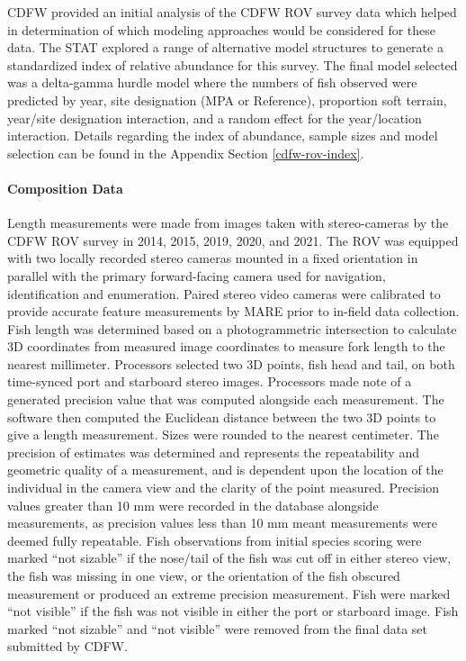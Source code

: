 \documentclass[11pt,
  english,
  letterpaper,
]{article}
\begin{document}
CDFW provided an initial analysis of the CDFW ROV survey data which helped in determination of which modeling approaches would be considered for these data. The STAT explored a range of alternative model structures to generate a standardized index of relative abundance for this survey. The final model selected was a delta-gamma hurdle model where the numbers of fish observed were predicted by year, site designation (MPA or Reference), proportion soft terrain, year/site designation interaction, and a random effect for the year/location interaction. Details regarding the index of abundance, sample sizes and model selection can be found in the Appendix Section \ref{cdfw-rov-index}.

\hypertarget{composition-data-4}{%
\paragraph{Composition Data}\label{composition-data-4}}

\hfill\break

Length measurements were made from images taken with stereo-cameras by the CDFW ROV survey in 2014, 2015, 2019, 2020, and 2021. The ROV was equipped with two locally recorded stereo cameras mounted in a fixed orientation in parallel with the primary forward-facing camera used for navigation, identification and enumeration. Paired stereo video cameras were calibrated to provide accurate feature measurements by MARE prior to in-field data collection. Fish length was determined based on a photogrammetric intersection to calculate 3D coordinates from measured image coordinates to measure fork length to the nearest millimeter. Processors selected two 3D points, fish head and tail, on both time-synced port and starboard stereo images. Processors made note of a generated precision value that was computed alongside each measurement. The software then computed the Euclidean distance between the two 3D points to give a length measurement. Sizes were rounded to the nearest centimeter. The precision of estimates was determined and represents the repeatability and geometric quality of a measurement, and is dependent upon the location of the individual in the camera view and the clarity of the point measured. Precision values greater than 10 mm were recorded in the database alongside measurements, as precision values less than 10 mm meant measurements were deemed fully repeatable. Fish observations from initial species scoring were marked ``not sizable'' if the nose/tail of the fish was cut off in either stereo view, the fish was missing in one view, or the orientation of the fish obscured measurement or produced an extreme precision measurement. Fish were marked ``not visible'' if the fish was not visible in either the port or starboard image. Fish marked ``not sizable'' and ``not visible'' were removed from the final data set submitted by CDFW.
\end{document}
